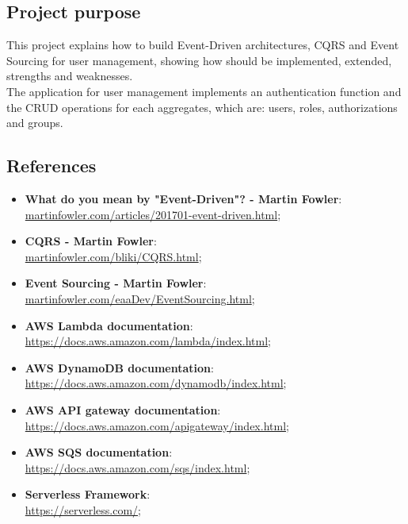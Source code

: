 \subsection{Project purpose}
This project explains how to build Event-Driven architectures, CQRS and Event Sourcing for user management, showing how should be implemented, extended, strengths and weaknesses.\\
The application for user management implements an authentication function and the CRUD operations for each aggregates, which are: users, roles, authorizations and groups.

\subsection{References}
\begin{itemize}
	\item \textbf{What do you mean by "Event-Driven"? - Martin Fowler}:\\ \url{martinfowler.com/articles/201701-event-driven.html};
	\item \textbf{CQRS - Martin Fowler}:\\ \url{martinfowler.com/bliki/CQRS.html};
	\item \textbf{Event Sourcing - Martin Fowler}:\\ \url{martinfowler.com/eaaDev/EventSourcing.html};
	\item \textbf{AWS Lambda documentation}:\\ \url{https://docs.aws.amazon.com/lambda/index.html};
	\item \textbf{AWS DynamoDB documentation}:\\ \url{https://docs.aws.amazon.com/dynamodb/index.html};
	\item \textbf{AWS API gateway documentation}:\\ \url{https://docs.aws.amazon.com/apigateway/index.html};
	\item \textbf{AWS SQS documentation}:\\ \url{https://docs.aws.amazon.com/sqs/index.html};
	\item \textbf{Serverless Framework}:\\ \url{https://serverless.com/};
	
\end{itemize}
\pagebreak
